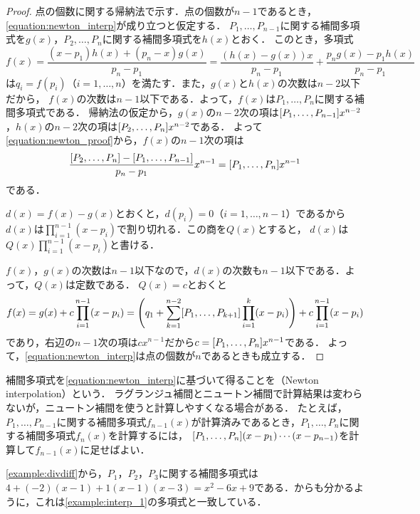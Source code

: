 \documentclass[../../main]{subfiles}
\begin{document}
\begin{proof}
点の個数に関する帰納法で示す．点の個数が\(n-1\)であるとき，\cref{equation:newton_interp}が成り立つと仮定する．
\(P_1,\dots,P_{n-1}\)に関する補間多項式を\(g(x)\)，\(P_2,\dots,P_n\)に関する補間多項式を\(h(x)\)とおく．
このとき，多項式
\begin{equation}
  \label{equation:newton_proof}
  f(x) = \frac{(x-p_1)h(x)+(p_n-x)g(x)}{p_n-p_1}
  = \frac{(h(x)-g(x))x}{p_n-p_1}+\frac{p_ng(x)-p_1h(x)}{p_n-p_1}  
\end{equation}
は\(q_i=f(p_i)\)（\(i=1,\dots,n\)）を満たす．また，\(g(x)\)と\(h(x)\)の次数は\(n-2\)以下だから，
\(f(x)\)の次数は\(n-1\)以下である．よって，\(f(x)\)は\(P_1,\dots,P_n\)に関する補間多項式である．
帰納法の仮定から，\(g(x)\)の\(n-2\)次の項は\(\divdiff{P_1,\dots,P_{n-1}}x^{n-2}\)，\(h(x)\)の\(n-2\)次の項は\(\divdiff{P_2,\dots,P_n}x^{n-2}\)である．
よって\cref{equation:newton_proof}から，\(f(x)\)の\(n-1\)次の項は
\[
  \frac{\divdiff{P_2,\dots,P_n}-\divdiff{P_1,\dots,P_{n-1}}}{p_n-p_1}x^{n-1} = \divdiff{P_1,\dots,P_n}x^{n-1}
\]
である．

\(d(x)=f(x)-g(x)\)とおくと，\(d(p_i)=0\)（\(i=1,\dots,n-1\)）であるから
\(d(x)\)は\(\prod_{i=1}^{n-1}(x-p_i)\)で割り切れる．この商を\(Q(x)\)とすると，
\(d(x)\)は\(Q(x)\prod_{i=1}^{n-1}(x-p_i)\)と書ける．

\(f(x)\)，\(g(x)\)の次数は\(n-1\)以下なので，\(d(x)\)の次数も\(n-1\)以下である．よって，\(Q(x)\)は定数である．
\(Q(x)=c\)とおくと
\[
  f(x) = g(x)+c\prod_{i=1}^{n-1}(x-p_i)
  = \pqty*{q_1+\sum_{k=1}^{n-2}\divdiff{P_1,\dots,P_{k+1}}\prod_{i=1}^k(x-p_i)}+c\prod_{i=1}^{n-1}(x-p_i)
\]
であり，右辺の\(n-1\)次の項は\(cx^{n-1}\)だから\(c=\divdiff{P_1,\dots,P_n}x^{n-1}\)である．
よって，\cref{equation:newton_interp}は点の個数が\(n\)であるときも成立する．
\end{proof}

補間多項式を\cref{equation:newton_interp}に基づいて得ることを（Newton interpolation）という．
ラグランジュ補間とニュートン補間で計算結果は変わらないが，ニュートン補間を使うと計算しやすくなる場合がある．
たとえば，\(P_1,\dots,P_{n-1}\)に関する補間多項式\(f_{n-1}(x)\)が計算済みであるとき，\(P_1,\dots,P_n\)に関する補間多項式\(f_n(x)\)を計算するには，
\(\divdiff{P_1,\dots,P_n}(x-p_1)\dotsm(x-p_{n-1})\)を計算して\(f_{n-1}(x)\)に足せばよい．

\begin{example}
\cref{example:divdiff}から，\(P_1\)，\(P_2\)，\(P_3\)に関する補間多項式は
\(4+(-2)(x-1)+1(x-1)(x-3)=x^2-6x+9\)である．からも分かるように，これは\cref{example:interp_1}の多項式と一致している．
\end{example}
\end{document}
